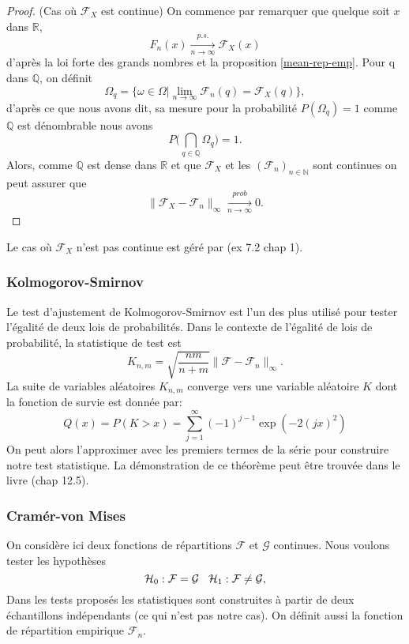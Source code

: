 \documentclass[a4paper,10pt]{article}
\begin{document}
\begin{proof} (Cas où $\mathcal{F}_X$ est continue)
	On commence par remarquer que quelque soit $x$ dans $\mathbb{R}$, \[F_{n}(x)\xrightarrow[n\to \infty]{p.s.}\mathcal{F}_X(x)\] d'après la loi forte des grands nombres et la proposition \eqref{mean-rep-emp}. Pour q dans $\mathbb{Q}$, on définit 
	\[\Omega_{q}=\{\omega \in \Omega | \lim_{n \to \infty} \mathcal{F}_{n}(q)=\mathcal{F}_X(q)\},\]
	d'après ce que nous avons dit, sa mesure pour la probabilité $P(\Omega_q)=1$ comme $\mathbb{Q}$ est dénombrable nous avons  
	\[P\Big(\bigcap_{q \in \mathbb{Q}} \Omega_q \Big)=1.\]
	Alors, comme $\mathbb{Q}$ est dense dans $\mathbb{R}$ et que $\mathcal{F}_{X}$ et les $(\mathcal{F}_n)_{n \in \mathbb{N}}$ sont continues on peut assurer que   
	\[	\|\mathcal{F}_{X}-\mathcal{F}_{n}\|_{\infty} \xrightarrow[n\to \infty]{prob} 0. \]
\end{proof}
Le cas où $\mathcal{F}_{X}$ n'est pas continue est géré par \cite{durrett2019probability} (ex 7.2 chap 1).
\subsubsection{Kolmogorov-Smirnov}

Le test d'ajustement  de  Kolmogorov-Smirnov est  l'un des plus  utilisé pour tester l'égalité de deux lois  de probabilités. Dans  le  contexte de  l'égalité de lois  de probabilité, la statistique  de  test  est 
\[K_{n,m}= \sqrt{\frac{nm}{n+m}}\|\mathcal{F}-\mathcal{F}_n\|_{\infty}.\]
La suite de variables aléatoires $K_{n,m}$ converge vers une variable aléatoire $K$ dont la fonction de survie est donnée par: 
\begin{equation}
	Q(x)=P(K>x)=\sum_{j=1}^{\infty}(-1)^{j-1}\exp(-2(jx)^2)
\end{equation}
On peut alors l'approximer avec les premiers termes de la série pour construire notre test statistique. La démonstration de ce théorème peut être trouvée dans le livre \cite{walker1965probability}(chap 12.5).


\subsubsection{Cramér-von Mises}
On considère ici deux fonctions de répartitions $\mathcal{F}$ et $\mathcal{G}$ continues. Nous voulons tester les hypothèses
\begin{equation*}
	\mathcal{H}_0 : \mathcal{F} = \mathcal{G} \hspace{3mm} \mathcal{H}_1 : \mathcal{F} \neq \mathcal{G},
\end{equation*}
Dans les tests proposés les statistiques sont construites à partir de deux échantillons indépendants (ce qui n'est pas notre cas). On définit aussi la fonction de répartition empirique $\mathcal{F}_n$.
\end{document}

